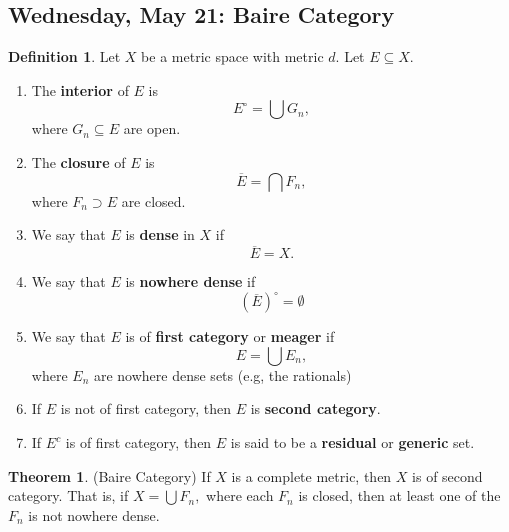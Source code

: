 \documentclass[10pt, oneside]{article}
\theoremstyle{definition}
\newtheorem{thm}{Theorem}
\newtheorem{defn}{Definition}
\begin{document}
\subsection{Wednesday, May 21: Baire Category}
\begin{defn}
    Let $X$ be a metric space with metric $d.$ Let $E\subseteq X.$
    \begin{enumerate}
        \item The \textbf{interior} of $E$ is 
        \[E^\circ  = \bigcup G_n,\] where $G_n \subseteq E$ are open.
        \item The \textbf{closure} of $E$ is 
        \[\overline{E} = \bigcap F_n,\] where $F_n \supset E$ are closed.
        \item We say that $E$ is \textbf{dense} in $X$ if 
        \[\overline{E}= X.\]
        \item We say that $E$ is \textbf{nowhere dense} if 
        \[(\overline{E})^\circ  = \emptyset\]
        \item We say that $E$ is of \textbf{first category} or \textbf{meager} if 
        \[E = \bigcup E_n,\] where $E_n$ are nowhere dense sets (e.g, the rationals)
        \item If $E$ is not of first category, then $E$ is \textbf{second category}.
        \item If $E^c$ is of first category, then $E$ is said to be a \textbf{residual} or \textbf{generic} set.
    \end{enumerate}
\end{defn}

\begin{thm}
    (Baire Category) If $X$ is a complete metric, then $X$ is of second category. That is, if $X = \bigcup F_n,$ where each $F_n$ is closed, then at least one of the $F_n$ is not nowhere dense.
\end{thm}
\end{document}
